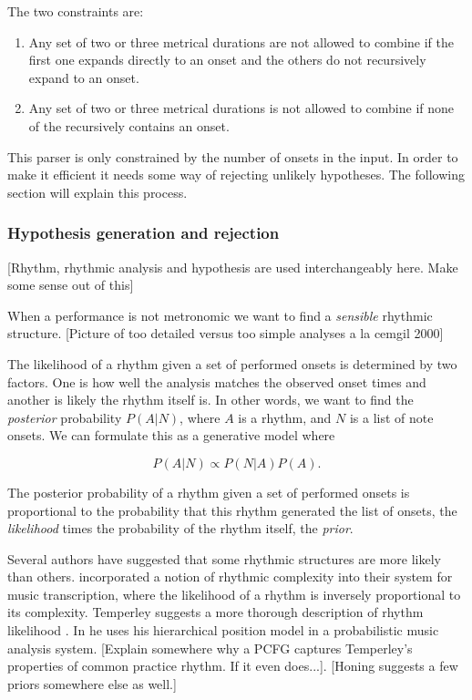 The two constraints are:
\begin{enumerate}
\item Any set of two or three metrical durations are not allowed to combine if the first one expands directly to an onset and the others do not recursively expand to an onset.
\item Any set of two or three metrical durations is not allowed to combine if none of the recursively contains an onset.
\end{enumerate}

This parser is only constrained by the number of onsets in the input. In order to make it efficient it needs some way of rejecting unlikely hypotheses. The following section will explain this process.


\subsubsection{Hypothesis generation and rejection}

[Rhythm, rhythmic analysis and hypothesis are used interchangeably here. Make some sense out of this]

When a performance is not metronomic we want to find a \textit{sensible} rhythmic structure. [Picture of too detailed versus too simple analyses a la cemgil 2000]

The likelihood of a rhythm given a set of performed onsets is determined by two factors. One is how well the analysis matches the observed onset times and another is likely the rhythm itself is. In other words, we want to find the \textit{posterior} probability $P(A|N)$, where $A$ is a rhythm, and $N$ is a list of note onsets. We can formulate this as a generative model where

\begin{equation}
\label{eq:model}
P(A|N) \propto P(N|A)P(A).
\end{equation}

The posterior probability of a rhythm given a set of performed onsets is proportional to the probability that this rhythm generated the list of onsets, the \textit{likelihood} times the probability of the rhythm itself, the \textit{prior}.

Several authors have suggested that some rhythmic structures are more likely than others. \cite{cemgil2000rhythm} incorporated a notion of rhythmic complexity into their system for music transcription, where the likelihood of a rhythm is inversely proportional to its complexity. Temperley suggests a more thorough description of rhythm likelihood \citep{temperley2010modeling}. In \cite{temperley2009unified} he uses his hierarchical position model in a probabilistic music analysis system. [Explain somewhere why a PCFG captures Temperley's properties of common practice rhythm. If it even does...]. [Honing suggests a few priors somewhere else as well.]

